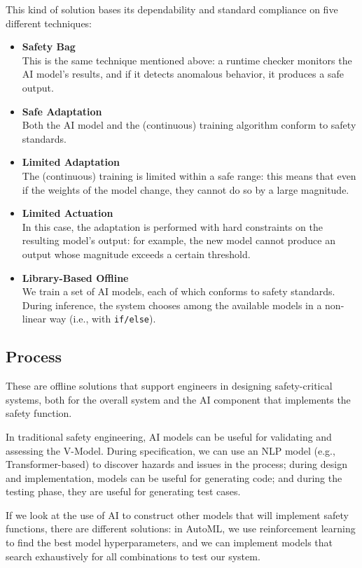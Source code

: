 This kind of solution bases its dependability and standard compliance on five different techniques:
\begin{itemize}
    \item \textbf{Safety Bag} \\
        This is the same technique mentioned above: a runtime checker monitors the AI model's results, and if it detects anomalous behavior, it produces a safe output.
    \item \textbf{Safe Adaptation} \\
        Both the AI model and the (continuous) training algorithm conform to safety standards.
    \item \textbf{Limited Adaptation} \\
        The (continuous) training is limited within a safe range: this means that even if the weights of the model change, they cannot do so by a large magnitude.
    \item \textbf{Limited Actuation} \\
        In this case, the adaptation is performed with hard constraints on the resulting model's output: for example, the new model cannot produce an output whose magnitude exceeds a certain threshold.
    \item \textbf{Library-Based Offline} \\
        We train a set of AI models, each of which conforms to safety standards. During inference, the system chooses among the available models in a non-linear way (i.e., with \texttt{if/else}).
\end{itemize}

\subsection{Process}
These are offline solutions that support engineers in designing safety-critical systems, both for the overall system and the AI component that implements the safety function.

\myskip

In traditional safety engineering, AI models can be useful for validating and assessing the V-Model. During specification, we can use an NLP model (e.g., Transformer-based) to discover hazards and issues in the process; during design and implementation, models can be useful for generating code; and during the testing phase, they are useful for generating test cases.

If we look at the use of AI to construct other models that will implement safety functions, there are different solutions: in AutoML, we use reinforcement learning to find the best model hyperparameters, and we can implement models that search exhaustively for all combinations to test our system.